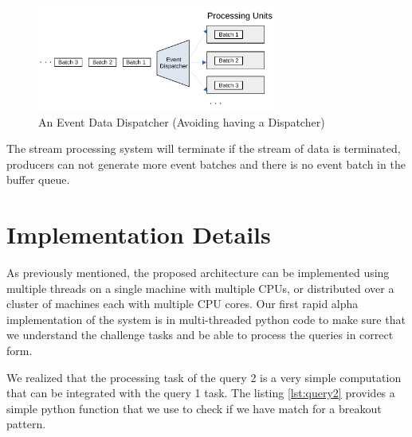 \begin{figure}[]
    \begin{center}
        \includegraphics[width=0.7\textwidth]{./images/Stream-Batch-Distributions}
        \caption{An Event Data Dispatcher (Avoiding having a Dispatcher)}
        \label{fig:batch-distributions}
    \end{center}
\end{figure}




The stream processing system will terminate if the stream of data is terminated, producers can not generate more event batches 
and there is no event batch in the buffer queue. 





\section{Implementation Details}\label{sec:implementation}
As previously mentioned, the proposed architecture can be implemented using multiple threads on a single machine with multiple CPUs, or distributed over a 
cluster of machines each with multiple CPU cores. Our first rapid alpha implementation of the system is in multi-threaded python code to make sure
that we understand the challenge tasks and be able to process the queries in correct form.  


We realized that the processing task of the query 2 is a very simple computation that can be integrated with the query 1 task. 
The listing \ref{lst:query2} provides a simple python function that we use to check if we have match for a breakout pattern. 





